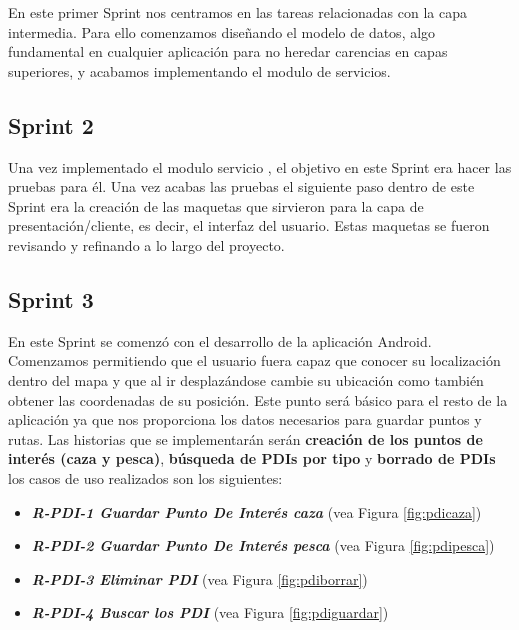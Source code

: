 En este primer Sprint nos centramos en las tareas relacionadas con la capa intermedia. Para ello comenzamos diseñando el modelo de datos, algo fundamental en cualquier aplicación para no heredar carencias en capas superiores, y acabamos implementando el modulo de servicios.


\subsection{Sprint 2}
 Una vez implementado el modulo servicio , el objetivo en este Sprint era hacer las pruebas para él.
 Una vez acabas las pruebas el siguiente paso dentro de este Sprint era la creación de las maquetas que sirvieron para la capa de presentación/cliente, es decir, el interfaz del usuario. Estas maquetas se fueron revisando y refinando a lo largo del proyecto.
 
\subsection{Sprint 3}

En este Sprint se comenzó con el desarrollo de la aplicación Android. Comenzamos permitiendo que el usuario fuera capaz que conocer su localización dentro del mapa y que al ir desplazándose cambie su ubicación como también obtener las coordenadas de su posición. Este punto será básico para el resto de la aplicación ya que nos proporciona los datos necesarios para guardar puntos y rutas. Las historias que se implementarán serán \textbf{creación de los puntos de interés (caza y pesca)},\textbf{ búsqueda de PDIs por tipo} y \textbf{borrado de PDIs} los casos de uso realizados son los siguientes:

\begin{itemize}

\item\textbf{\textit{ R-PDI-1 Guardar Punto De Interés caza}}  (vea Figura \ref{fig:pdicaza})
\item\textit{ \textbf{R-PDI-2 Guardar Punto De Interés pesca}}  (vea Figura \ref{fig:pdipesca})
\item \textbf{\textit{R-PDI-3 Eliminar PDI}}  (vea Figura \ref{fig:pdiborrar})
\item \textbf{\textit{R-PDI-4 Buscar los PDI}}  (vea Figura \ref{fig:pdiguardar})
\end{itemize} 


